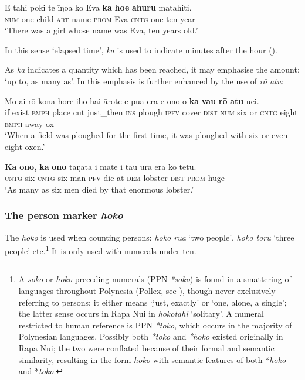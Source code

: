 \ea\label{ex:4.27}
\gll E tahi poki te {\ꞌ}īŋoa ko Eva \textbf{ka} \textbf{ho{\ꞌ}e} \textbf{{\ꞌ}ahuru} matahiti. \\
\textsc{num} one child \textsc{art} name \textsc{prom} Eva \textsc{cntg} one ten year \\

\glt
‘There was a girl whose name was Eva, ten years old.’ \textstyleExampleref{[R210.001]} 
\z

In this sense ‘elapsed time’, \textit{ka} is used to indicate minutes after the hour (). 

As \textit{ka} indicates a quantity which has been reached, it may emphasise the amount: ‘up to, as many as’. In  this emphasis is further enhanced by the use of \textit{rō atu}:

\ea\label{ex:4.28}
\gll Mo ai rō kona hore iho hai {\ꞌ}ārote e pu{\ꞌ}a era e ono  {\ꞌ}o \textbf{ka} \textbf{va}{\ꞌ}\textbf{u} \textbf{rō} \textbf{atu} {\ꞌ}uei.\\
if exist \textsc{emph} place cut just\_then \textsc{ins} plough \textsc{ipfv} cover \textsc{dist} \textsc{num} six  or \textsc{cntg} eight \textsc{emph} away ox\\

\glt 
‘When a field was ploughed for the first time, it was ploughed with six or even eight oxen.’ \textstyleExampleref{[R539-1.110–111]}
\z

\ea\label{ex:4.29}
\gll \textbf{Ka} \textbf{ono,} \textbf{ka} \textbf{ono} taŋata i mate {\ꞌ}i tau {\ꞌ}ura era ko tetu. \\
\textsc{cntg} six \textsc{cntg} six man \textsc{pfv} die at \textsc{dem} lobster \textsc{dist} \textsc{prom} huge \\

\glt 
‘As many as six men died by that enormous lobster.’ \textstyleExampleref{[Mtx-4-05.014]}
\z

\subsubsection[The person marker hoko]{The person marker \textit{hoko}}\label{sec:4.3.2.3}

The  \textit{hoko} is used when counting persons: \textit{hoko rua} ‘two people’, \textit{hoko toru} ‘three people’ etc.\footnote{\label{fn:175}A  \textit{soko} or \textit{hoko} preceding numerals (PPN \textit{*soko}) is found in a smattering of languages throughout Polynesia (Pollex, see \citealt{GreenhillClark2011}), though never exclusively referring to persons; it either means ‘just, exactly’ or ‘one, alone, a single’; the latter sense occurs in Rapa Nui in \textit{hokotahi} ‘solitary’. 
A numeral  restricted to human reference is PPN \textit{*toko}, which occurs in the majority of Polynesian languages. Possibly both \textit{*toko} and \textit{*hoko} existed originally in Rapa Nui; the two were conflated because of their formal and semantic similarity, resulting in the form \textit{hoko} with semantic features of both *\textit{hoko} and *\textit{toko}.} It is only used with numerals under ten. 

